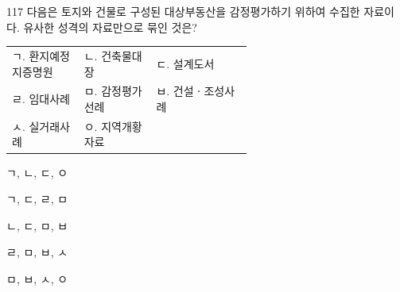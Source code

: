 \begin{question}{117}
다음은 토지와 건물로 구성된 대상부동산을 감정평가하기 위하여 수집한 자료이다. 유사한 성격의 자료만으로 묶인 것은?
\begin{framedtext}
\begin{tabular}{@{}p{0.3\linewidth}p{0.3\linewidth}l@{}}
ㄱ. 환지예정지증명원 & ㄴ. 건축물대장 & ㄷ. 설계도서 \\
ㄹ. 임대사례 & ㅁ. 감정평가선례 & ㅂ. 건설ㆍ조성사례 \\
ㅅ. 실거래사례 & ㅇ. 지역개황자료 &
\end{tabular}
\end{framedtext}
\begin{choices}
  \item ㄱ, ㄴ, ㄷ, ㅇ
  \item ㄱ, ㄷ, ㄹ, ㅁ
  \item ㄴ, ㄷ, ㅁ, ㅂ
  \item ㄹ, ㅁ, ㅂ, ㅅ
  \item ㅁ, ㅂ, ㅅ, ㅇ
\end{choices}
\end{question}
